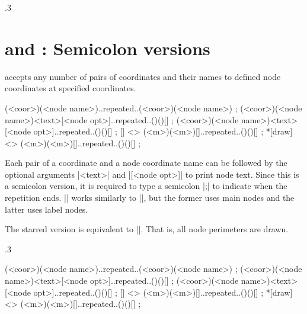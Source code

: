 \begin{tzcode}{.3}
\end{tzcode}


\section{\protect\cmd{\tznodes} and \protect\cmd{\tznodes*}: Semicolon versions}
\label{s:tznodes}

\icmd{\tznodes} accepts any number of  pairs of coordinates and their names to defined node coordinates at specified coordinates.

\begin{tzdef}{}
\tznodes(<coor>)(<node name>)..repeated..(<coor>)(<node name>) ;
\tznodes(<coor>)(<node name>){<text>}[<node opt>]..repeated..()(){}[] ;
        (<coor>)(<node name>){<text>}[<node opt>]..repeated..()(){}[] ;
  []    <> (<m>)(<m>){}[]..repeated..()(){}[] ; 
 *[draw]<> (<m>)(<m>){}[]..repeated..()(){}[] ; 
\end{tzdef}

Each pair of a coordinate and a node coordinate name can be followed by the optional arguments |{<text>}| and |[<node opt>]| to print node text.
Since this is a semicolon version, it is required to type a semicolon |;| to indicate when the repetition ends.
|\tznodes| works similarly to |\tzcoors|, but the former uses main nodes and the latter uses label nodes.

The starred version \icmd{\tznodes*} is equivalent to |\tznodes[draw]|. That is, all node perimeters are drawn.

\begin{tzcode}{.3}
{}
\end{tzcode}


\begin{tzdef}{}
\tznodes(<coor>)(<node name>)..repeated..(<coor>)(<node name>) ;
\tznodes(<coor>)(<node name>){<text>}[<node opt>]..repeated..()(){}[] ;
        (<coor>)(<node name>){<text>}[<node opt>]..repeated..()(){}[] ;
  []    <> (<m>)(<m>){}[]..repeated..()(){}[] ; 
 *[draw]<> (<m>)(<m>){}[]..repeated..()(){}[] ; 
\end{tzdef}



